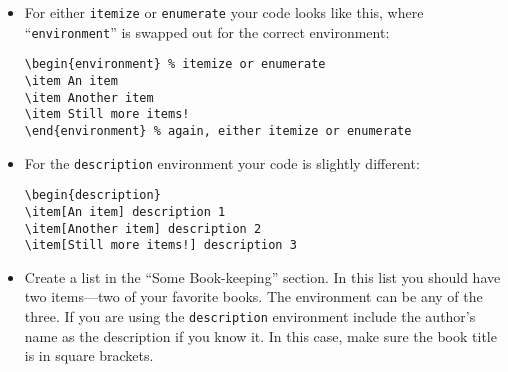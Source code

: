 \begin{itemize}

\item For either \texttt{itemize} or \texttt{enumerate} your code
  looks like this, where ``\texttt{environment}'' is swapped out for
  the correct environment:

\begin{center}
  \begin{minipage}{.8\linewidth}
    \begin{framed}
\begin{verbatim}
\begin{environment} % itemize or enumerate
\item An item
\item Another item
\item Still more items!
\end{environment} % again, either itemize or enumerate
\end{verbatim}
    \end{framed}
  \end{minipage}
\end{center}

\item For the \texttt{description} environment your code is slightly
  different:

\begin{center}
  \begin{minipage}{.8\linewidth}
    \begin{framed}
\begin{verbatim}
\begin{description}
\item[An item] description 1
\item[Another item] description 2
\item[Still more items!] description 3
\end{verbatim}
    \end{framed}
  \end{minipage}
\end{center}


\item Create a list in the ``Some Book-keeping'' section. In this list you
  should have two items---two of your favorite books. The environment can be any
  of the three. If you are using the \texttt{description} environment include
  the author's name as the description if you know it. In this case, make sure
  the book title is in square brackets.
\end{itemize}

